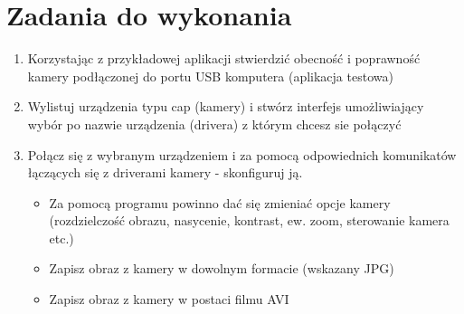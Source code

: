 \documentclass[a4paper,12pt]{extarticle}  %
\begin{document}
\section{Zadania do wykonania}
\begin{enumerate}
	\item Korzystając z przykładowej aplikacji stwierdzić obecność i poprawność kamery podłączonej do portu USB komputera (aplikacja testowa)
	\begin{figure}[H]
	   \centering
	\end{figure}
	\item Wylistuj urządzenia typu cap (kamery) i stwórz interfejs umożliwiający wybór po nazwie urządzenia (drivera) z którym chcesz sie połączyć
	\item Połącz się z wybranym urządzeniem i za pomocą odpowiednich komunikatów łączących się z driverami kamery - skonfiguruj ją.
	      \begin{itemize}
		      \item Za pomocą programu powinno dać się zmieniać opcje kamery (rozdzielczość obrazu, nasycenie, kontrast, ew. zoom, sterowanie kamera etc.)
		      \item Zapisz obraz z kamery w dowolnym formacie (wskazany JPG)
		      \item Zapisz obraz z kamery w postaci filmu AVI

\end{itemize}
\end{enumerate}
\end{document}
